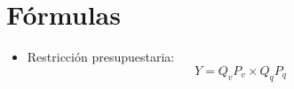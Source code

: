 
\section{Fórmulas}
\begin{itemize}
    \item Restricción presupuestaria:
        \[
          Y = Q_vP_v \times Q_qP_q
        \]
\end{itemize}






